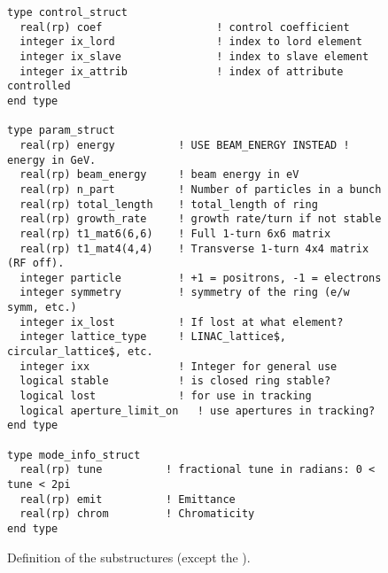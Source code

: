 \begin{figure}[tb]
\centering
\begin{verbatim}
type control_struct
  real(rp) coef                  ! control coefficient
  integer ix_lord                ! index to lord element
  integer ix_slave               ! index to slave element
  integer ix_attrib              ! index of attribute controlled
end type

type param_struct
  real(rp) energy          ! USE BEAM_ENERGY INSTEAD ! energy in GeV.
  real(rp) beam_energy     ! beam energy in eV
  real(rp) n_part          ! Number of particles in a bunch
  real(rp) total_length    ! total_length of ring
  real(rp) growth_rate     ! growth rate/turn if not stable
  real(rp) t1_mat6(6,6)    ! Full 1-turn 6x6 matrix
  real(rp) t1_mat4(4,4)    ! Transverse 1-turn 4x4 matrix (RF off).
  integer particle         ! +1 = positrons, -1 = electrons
  integer symmetry         ! symmetry of the ring (e/w symm, etc.)
  integer ix_lost          ! If lost at what element?
  integer lattice_type     ! LINAC_lattice$, circular_lattice$, etc.
  integer ixx              ! Integer for general use
  logical stable           ! is closed ring stable?
  logical lost             ! for use in tracking
  logical aperture_limit_on   ! use apertures in tracking?
end type

type mode_info_struct
  real(rp) tune          ! fractional tune in radians: 0 < tune < 2pi
  real(rp) emit          ! Emittance
  real(rp) chrom         ! Chromaticity
end type
\end{verbatim}
\caption{Definition of the  substructures 
(except the ).}
\label{f:sub_ring_struct}
\end{figure}

